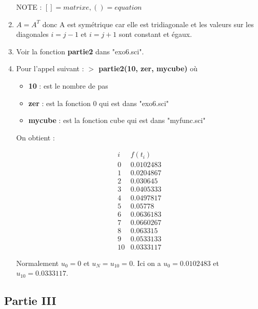 \documentclass[12pt, letterpaper]{article}
\begin{document}
\begin{enumerate}
    NOTE : $[] = matrixe, () = equation$


  \item
    $A = A^T$ donc A est symétrique car elle est tridiagonale et les
    valeurs sur les diagonales $i = j - 1$ et $i = j + 1$ sont
    constant et égaux.

  \item
    Voir la fonction \textbf{partie2} dans "exo6.sci".

  \item
    Pour l'appel suivant :\newline
    \textbf{$>$ partie2(10, zer, mycube)} \newline
    où \begin{itemize}
      \item \textbf{10} : est le nombre de pas
      \item \textbf{zer} : est la fonction 0 qui est dans "exo6.sci"
      \item \textbf{mycube} : est la fonction cube qui est dans "myfunc.sci"
    \end{itemize}

    On obtient :

    \begin{equation*}
      \begin{array}{ll}
        i & f(t_i) \\
        0 & 0.0102483 \\
        1 & 0.0204867 \\
        2 & 0.030645 \\
        3 & 0.0405333 \\
        4 & 0.0497817 \\
        5 & 0.05778  \\
        6 & 0.0636183 \\
        7 & 0.0660267 \\
        8 & 0.063315 \\
        9 & 0.0533133 \\
        10 & 0.0333117
      \end{array}
    \end{equation*}

    Normalement $u_0 = 0$ et $u_N = u_{10} = 0$. \newline
    Ici on a $u_0 = 0.0102483$ et $u_{10} = 0.0333117$.
  
\end{enumerate}

\subsection*{Partie III}
\end{document}
